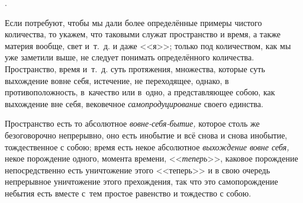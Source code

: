 \vspace{3mm}

.

Если потребуют, чтобы мы дали более определённые примеры чистого количества,
то укажем, что таковыми служат пространство и время, а также материя
вообще, свет и~т.~д. и даже <<я>>; только под количеством, как мы уже
заметили выше, не следует понимать определённого количества. Пространство,
время и~т.~д. суть протяжения, множества, которые суть выхождение вовне себя,
истечение, не переходящее, однако, в противоположность, в~качество или
в~одно, а представляющее собою, как выхождение вне себя, вековечное
{\em самопродуцирование} своего единства.

Пространство есть то абсолютное {\em вовне-себя-бытие,} которое столь же
безоговорочно непрерывно, оно есть инобытие и всё снова и снова инобытие,
тождественное с собою; время есть некое абсолютное {\em выхождение вовне себя,}
некое порождение одного, момента времени, <<{\em теперь}>>, каковое порождение
непосредственно есть уничтожение этого <<теперь>> и в свою очередь непрерывное
уничтожение этого прехождения, так что это самопорождение небытия есть вместе
с~тем простое равенство и тождество с собою.


